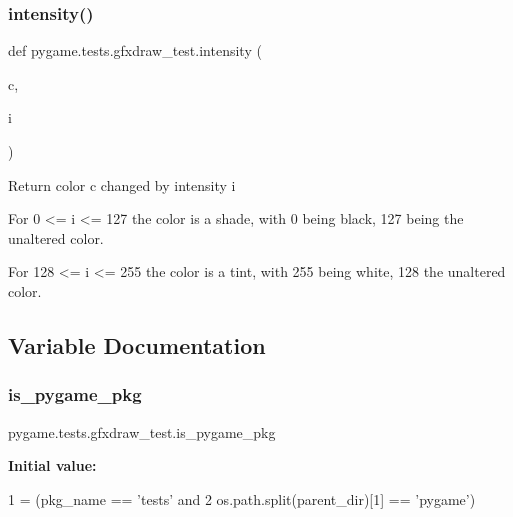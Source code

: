 \subsubsection{\texorpdfstring{intensity()}{intensity()}}
{\footnotesize\ttfamily def pygame.\+tests.\+gfxdraw\+\_\+test.\+intensity (\begin{DoxyParamCaption}\item[{}]{c,  }\item[{}]{i }\end{DoxyParamCaption})}

\begin{DoxyVerb}Return color c changed by intensity i

For 0 <= i <= 127 the color is a shade, with 0 being black, 127 being the
unaltered color.

For 128 <= i <= 255 the color is a tint, with 255 being white, 128 the
unaltered color.\end{DoxyVerb}
 

\subsection{Variable Documentation}
\mbox{\label{namespacepygame_1_1tests_1_1gfxdraw__test_a1d2ee28cc0000ecbee13df6f51a100f4}} 
\subsubsection{\texorpdfstring{is\+\_\+pygame\+\_\+pkg}{is\_pygame\_pkg}}
{\footnotesize\ttfamily pygame.\+tests.\+gfxdraw\+\_\+test.\+is\+\_\+pygame\+\_\+pkg}

{\bfseries Initial value\+:}
\begin{DoxyCode}
1 =  (pkg\_name == \textcolor{stringliteral}{'tests'} \textcolor{keywordflow}{and}
2                      os.path.split(parent\_dir)[1] == \textcolor{stringliteral}{'pygame'})
\end{DoxyCode}
\mbox{\label{namespacepygame_1_1tests_1_1gfxdraw__test_a8c9abdd83556b23287f0563c4f317852}} 

